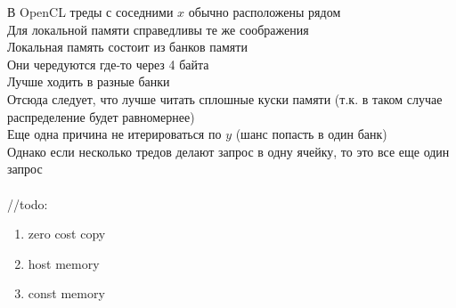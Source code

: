 \documentclass[12pt]{article}
\begin{document}
В OpenCL треды с соседними $x$ обычно расположены рядом\\
Для локальной памяти справедливы те же соображения\\
Локальная память состоит из банков памяти\\
Они чередуются где-то через 4 байта\\
Лучше ходить в разные банки\\
Отсюда следует, что лучше читать сплошные куски памяти (т.к. в таком случае распределение будет равномернее)\\
Еще одна причина не итерироваться по $y$ (шанс попасть в один банк)\\
Однако если несколько тредов делают запрос в одну ячейку, то это все еще один запрос\\\\
//todo:
\begin{enumerate}
    \item zero cost copy
    \item host memory
    \item const memory
\end{enumerate}
\end{document}
